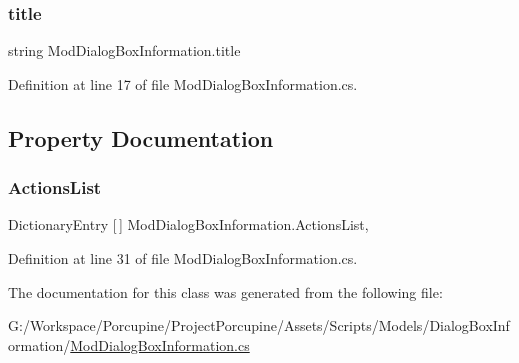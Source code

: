 \subsubsection{\texorpdfstring{title}{title}}
{\footnotesize\ttfamily string Mod\+Dialog\+Box\+Information.\+title}



Definition at line 17 of file Mod\+Dialog\+Box\+Information.\+cs.



\subsection{Property Documentation}
\mbox{\label{class_mod_dialog_box_information_a31815f22f389c7df1f9f2a2e15999e18}} 
\subsubsection{\texorpdfstring{Actions\+List}{ActionsList}}
{\footnotesize\ttfamily Dictionary\+Entry \mbox{[}$\,$\mbox{]} Mod\+Dialog\+Box\+Information.\+Actions\+List\hspace{0.3cm}{\ttfamily [get]}, {\ttfamily [set]}}



Definition at line 31 of file Mod\+Dialog\+Box\+Information.\+cs.



The documentation for this class was generated from the following file\+:\begin{DoxyCompactItemize}
\item 
G\+:/\+Workspace/\+Porcupine/\+Project\+Porcupine/\+Assets/\+Scripts/\+Models/\+Dialog\+Box\+Information/\hyperlink{_mod_dialog_box_information_8cs}{Mod\+Dialog\+Box\+Information.\+cs}\end{DoxyCompactItemize}
